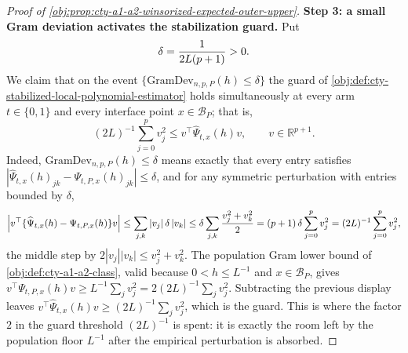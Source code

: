 \begin{proof}[Proof of \cref{obj:prop:cty-a1-a2-winsorized-expected-outer-upper}]
\textbf{Step 3: a small Gram deviation activates the stabilization guard.}  Put
\[
\delta={1\over2L(p+1)} >0 .
\]
We claim that on the event \(\{\mathrm{GramDev}_{n,p,P}(h)\leq\delta\}\) the guard of \cref{obj:def:cty-stabilized-local-polynomial-estimator} holds simultaneously at every arm \(t\in\{0,1\}\) and every interface point \(x\in\mathcal B_P\); that is,
\[
(2L)^{-1}\sum_{j=0}^p v_j^2
\leq
v^\top\widehat\Psi_{t,x}(h)v,
\qquad v\in\mathbb R^{p+1} .
\]
Indeed, \(\mathrm{GramDev}_{n,p,P}(h)\leq\delta\) means exactly that every entry satisfies \(|\widehat\Psi_{t,x}(h)_{jk}-\Psi_{t,P,x}(h)_{jk}|\leq\delta\), and for any symmetric perturbation with entries bounded by \(\delta\),
\[
\left|v^\top\{\widehat\Psi_{t,x}(h)-\Psi_{t,P,x}(h)\}v\right|
\leq
\sum_{j,k}|v_j|\,\delta\,|v_k|
\leq
\delta\sum_{j,k}{v_j^2+v_k^2\over2}
=
(p+1)\,\delta\sum_{j=0}^pv_j^2
=
(2L)^{-1}\sum_{j=0}^pv_j^2 ,
\]
the middle step by \(2|v_j||v_k|\leq v_j^2+v_k^2\).
The population Gram lower bound of \cref{obj:def:cty-a1-a2-class}, valid because \(0<h\leq L^{-1}\) and \(x\in\mathcal B_P\), gives \(v^\top\Psi_{t,P,x}(h)v\geq L^{-1}\sum_jv_j^2=2(2L)^{-1}\sum_jv_j^2\).  Subtracting the previous display leaves \(v^\top\widehat\Psi_{t,x}(h)v\geq(2L)^{-1}\sum_jv_j^2\), which is the guard.  This is where the factor \(2\) in the guard threshold \((2L)^{-1}\) is spent: it is exactly the room left by the population floor \(L^{-1}\) after the empirical perturbation is absorbed.


\end{proof}
